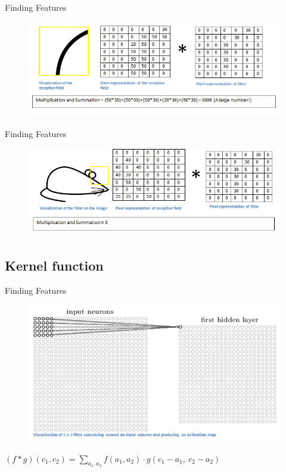 \documentclass[12pt]{beamer}
\begin{document}
\begin{frame}{Finding Features}
\begin{figure}
\includegraphics[width = 0.8\linewidth]{images/mousehi.png}
\label{fig:principle}
\end{figure}
\end{frame}

\begin{frame}{Finding Features}
\begin{figure}
\includegraphics[width = 0.8\linewidth]{images/mouselo.png}
\label{fig:principle}
\end{figure}

\end{frame}

\subsection{Kernel function}


\begin{frame}{Finding Features}
\begin{figure}
\includegraphics[width = 0.6\linewidth]{images/activation.png}
\label{fig:principle}
\end{figure}
$(f\ast g)(c_1, c_2) = \sum_{a_1, a_2} f(a_1, a_2) \cdot g(c_1-a_1,~ c_2-a_2)$

\end{frame}
\end{document}
